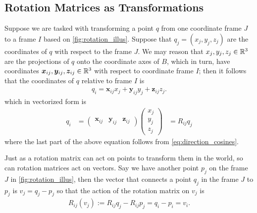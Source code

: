 \subsection{Rotation Matrices as Transformations}
%
Suppose we are tasked with transforming a point $q$ from one coordinate frame  $J$ to a frame $I$ based on  \autoref{fig:rotation_illus}. Suppose that $q_j = (x_j, y_j, z_j)$ are the coordinates of $q$ with respect to the frame $J$. We may reason that $x_j, y_j, z_j \in \mathbb{R}^3$ are the projections of $q$ onto the coordinate axes of $B$, which in turn, have coordinates $\bm{x}_{ij}, \bm{y}_{ij},\bm{z}_{ij} \in \mathbb{R}^3$ with respect to coordinate frame $I$; then it follows that the coordinates of $q$ relative to frame $I$ is
%
\begin{align}
q_i = \bm{x}_{ij} x_j + \bm{y}_{ij} y_j + \bm{z}_{ij} z_j.
\end{align}
%
which in vectorized form is 
%
\begin{align}
q_i & = \left(\begin{array}{ccc}
\bm{x}_{ij} &  \bm{y}_{ij} & \bm{z}_{ij}
\end{array}\right)
%
\left(\begin{array}{c}
x_j \\ y_j \\ z_j
\end{array} \right) 
& = R_{ij}q_j
\end{align}
%
where the last part of the above equation follows from \eqref{eq:direction_cosines}.

Just as a rotation matrix can act on points to transform them in the world, so can rotation matrices act on vectors. Say we have another point $p_j$ on the frame $J$ in \autoref{fig:rotation_illus}, then the vector that connects a point $q_j$ in the frame $J$ to $p_j$ is $v_j = q_j - p_j$ so that the action of the rotation matrix on $v_j$ is
%
\begin{align}
R_{ij}(v_j) := R_{ij} q_j - R_{ij} p_j = q_i - p_i = v_i.
\end{align}


